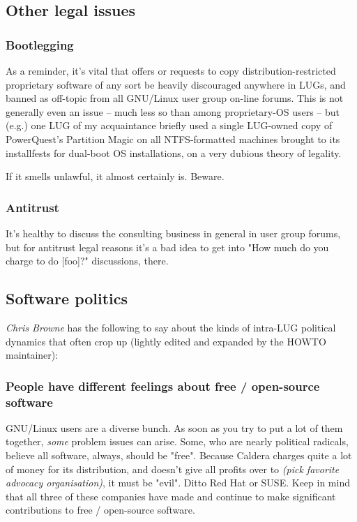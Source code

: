 \subsection{Other legal issues}






\subsubsection{Bootlegging}

As a reminder, it's vital that offers or requests to copy
distribution-restricted proprietary software of any sort be heavily
discouraged anywhere in LUGs, and banned as off-topic from all GNU/Linux user
group on-line forums.  This is not generally even an issue -- much less
so than among proprietary-OS users -- but (e.g.) one LUG of my
acquaintance briefly used a single LUG-owned copy of PowerQuest's
Partition Magic on all NTFS-formatted machines brought to its
installfests for dual-boot OS installations, on a very dubious theory
of legality.

If it smells unlawful, it almost certainly is.  Beware.




\subsubsection{Antitrust}

It's healthy to discuss the consulting business in general in user
group forums, but for antitrust legal reasons it's a bad idea to get into 
"How much do you charge to do {[}foo]?" discussions, there.




\subsection{Software politics}


\emph{Chris Browne} \texttt{\aesurl}
 has the
following to say about the kinds of intra-LUG political dynamics that
often crop up (lightly edited and expanded by the HOWTO maintainer):




\subsubsection{People have different feelings about free / open-source software}

GNU/Linux users are a diverse bunch.  As soon as you try to put a lot of
them together, {\itshape some\/} problem issues can arise. Some, who are
nearly political radicals, believe all software, always, should be
"free".  Because Caldera charges quite a lot of money for its
distribution, and doesn't give all profits over to {\itshape (pick favorite
advocacy organisation)\/}, it must be "evil".  Ditto Red Hat or
SUSE.  Keep in mind that all three of these companies have made and
continue to make significant contributions to free / open-source software.

